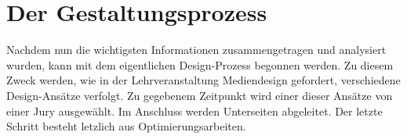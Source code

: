 \chapter{Der Gestaltungsprozess}
Nachdem nun die wichtigsten Informationen zusammengetragen und analysiert wurden, kann mit dem eigentlichen Design-Prozess begonnen werden. Zu diesem Zweck werden, wie in der Lehrveranstaltung Mediendesign gefordert, verschiedene Design-Ansätze verfolgt. Zu gegebenem Zeitpunkt wird einer dieser Ansätze von einer Jury ausgewählt. Im Anschluss werden Unterseiten abgeleitet. Der letzte Schritt besteht letzlich aus Optimierungsarbeiten.









